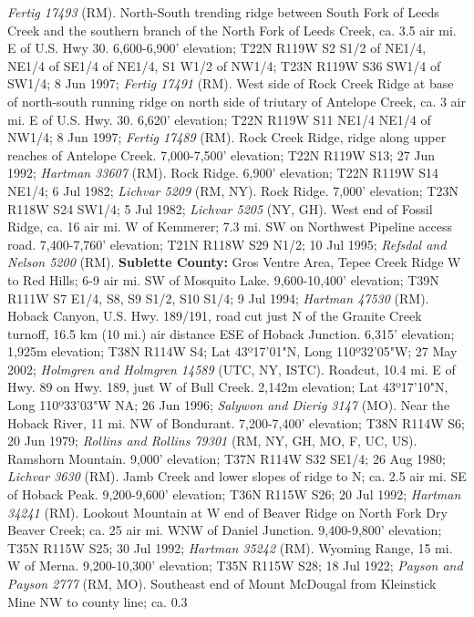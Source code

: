 \textit{Fertig 17493} (RM).
North-South trending ridge between South Fork of Leeds Creek and the southern
branch of the North Fork of Leeds Creek, ca. 3.5 air mi. E of U.S. Hwy 30.
6,600-6,900' elevation; T22N R119W S2 S1/2 of NE1/4, NE1/4 of SE1/4 of NE1/4,
S1 W1/2 of NW1/4; T23N R119W S36 SW1/4 of SW1/4; 8 Jun 1997;
\textit{Fertig 17491} (RM).
West side of Rock Creek Ridge at base of north-south running ridge on north
side of triutary of Antelope Creek, ca. 3 air mi. E of U.S. Hwy. 30.
6,620' elevation; T22N R119W S11 NE1/4 NE1/4 of NW1/4; 8 Jun 1997;
\textit{Fertig 17489} (RM).
Rock Creek Ridge, ridge along upper reaches of Antelope Creek. 7,000-7,500'
elevation; T22N R119W S13; 27 Jun 1992; \textit{Hartman 33607} (RM).
Rock Ridge. 6,900' elevation; T22N R119W S14 NE1/4; 6 Jul 1982;
\textit{Lichvar 5209} (RM, NY).
Rock Ridge. 7,000' elevation; T23N R118W S24 SW1/4; 5 Jul 1982;
\textit{Lichvar 5205} (NY, GH).
West end of Fossil Ridge, ca. 16 air mi. W of Kemmerer; 7.3 mi. SW on Northwest
Pipeline access road. 7,400-7,760' elevation; T21N R118W S29 N1/2; 10 Jul 1995;
\textit{Refsdal and Nelson 5200} (RM).
  \textbf{Sublette County:}
Gros Ventre Area, Tepee Creek Ridge W to Red Hills; 6-9 air mi. SW of
Mosquito Lake. 9,600-10,400' elevation; T39N R111W S7 E1/4, S8, S9 S1/2,
S10 S1/4; 9 Jul 1994; \textit{Hartman 47530} (RM).
Hoback Canyon, U.S. Hwy. 189/191, road cut just N of the Granite Creek turnoff,
16.5 km (10 mi.) air distance ESE of Hoback Junction. 6,315' elevation;
1,925m elevation; T38N R114W S4; Lat 43º17'01"N, Long 110º32'05"W; 27 May 2002;
\textit{Holmgren and Holmgren 14589} (UTC, NY, ISTC).
Roadcut, 10.4 mi. E of Hwy. 89 on Hwy. 189, just W of Bull Creek.
2,142m elevation; Lat 43º17'10"N, Long 110º33'03"W NA; 26 Jun 1996;
\textit{Salywon and Dierig 3147} (MO).
Near the Hoback River, 11 mi. NW of Bondurant. 7,200-7,400' elevation;
T38N R114W S6; 20 Jun 1979;
\textit{Rollins and Rollins 79301} (RM, NY, GH, MO, F, UC, US).
Ramshorn Mountain. 9,000' elevation; T37N R114W S32 SE1/4; 26 Aug 1980;
\textit{Lichvar 3630} (RM).
Jamb Creek and lower slopes of ridge to N; ca. 2.5 air mi. SE of Hoback Peak.
9,200-9,600' elevation; T36N R115W S26; 20 Jul 1992;
\textit{Hartman 34241} (RM).
Lookout Mountain at W end of Beaver Ridge on North Fork Dry Beaver Creek; ca.
25 air mi. WNW of Daniel Junction. 9,400-9,800' elevation; T35N R115W S25;
30 Jul 1992; \textit{Hartman 35242} (RM).
Wyoming Range, 15 mi. W of Merna. 9,200-10,300' elevation; T35N R115W S28;
18 Jul 1922; \textit{Payson and Payson 2777} (RM, MO).
Southeast end of Mount McDougal from Kleinstick Mine NW to county line; ca. 0.3
